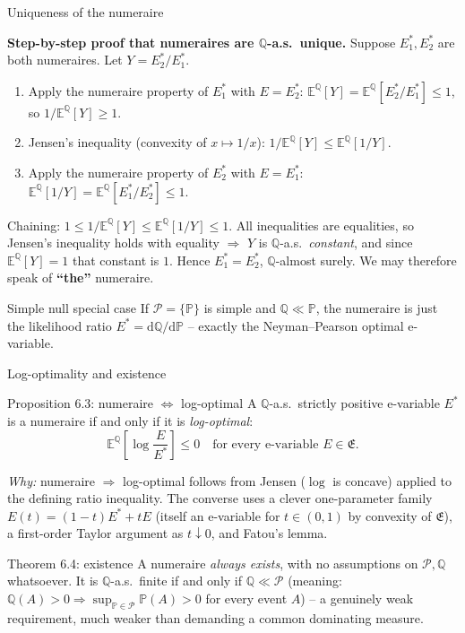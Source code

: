 \documentclass[aspectratio=169,10pt]{beamer}
\newcommand{\bE}{\mathbb{E}}
\newcommand{\bP}{\mathbb{P}}
\newcommand{\bQ}{\mathbb{Q}}
\newcommand{\cP}{\mathcal{P}}
\newcommand{\cE}{\mathfrak{E}}
\begin{document}
\begin{frame}{Uniqueness of the numeraire}

\textbf{Step-by-step proof that numeraires are $\bQ$-a.s.\ unique.}
Suppose $E_1^*, E_2^*$ are both numeraires. Let $Y = E_2^*/E_1^*$.

\begin{enumerate}
\item Apply the numeraire property of $E_1^*$ with $E = E_2^*$:
$\bE^{\bQ}[Y] = \bE^{\bQ}[E_2^*/E_1^*] \le 1$, so $1/\bE^{\bQ}[Y] \ge 1$.
\item Jensen's inequality (convexity of $x \mapsto 1/x$):
$1/\bE^{\bQ}[Y] \le \bE^{\bQ}[1/Y]$.
\item Apply the numeraire property of $E_2^*$ with $E = E_1^*$:
$\bE^{\bQ}[1/Y] = \bE^{\bQ}[E_1^*/E_2^*] \le 1$.
\end{enumerate}
Chaining: $1 \le 1/\bE^{\bQ}[Y] \le \bE^{\bQ}[1/Y] \le 1$. All
inequalities are equalities, so Jensen's inequality holds with equality
$\Rightarrow$ $Y$ is $\bQ$-a.s.\ \emph{constant}, and since
$\bE^{\bQ}[Y]=1$ that constant is $1$. Hence $E_1^* = E_2^*$,
$\bQ$-almost surely. We may therefore speak of \textbf{``the''}
numeraire.

\begin{block}{Simple null special case}
If $\cP = \{\bP\}$ is simple and $\bQ \ll \bP$, the numeraire is just
the likelihood ratio $E^* = \mathrm{d}\bQ/\mathrm{d}\bP$ -- exactly the
Neyman--Pearson optimal e-variable.
\end{block}
\end{frame}

\begin{frame}{Log-optimality and existence}

\begin{block}{Proposition 6.3: numeraire $\Leftrightarrow$ log-optimal}
A $\bQ$-a.s.\ strictly positive e-variable $E^*$ is a numeraire if and
only if it is \emph{log-optimal}:
\[
\bE^{\bQ}\!\left[\log \frac{E}{E^*}\right] \le 0 \quad \text{for every e-variable } E \in \cE.
\]
\end{block}

\emph{Why:} numeraire $\Rightarrow$ log-optimal follows from Jensen
($\log$ is concave) applied to the defining ratio inequality. The
converse uses a clever one-parameter family $E(t) = (1-t)E^* + tE$
(itself an e-variable for $t\in(0,1)$ by convexity of $\cE$), a
first-order Taylor argument as $t \downarrow 0$, and Fatou's lemma.

\begin{block}{Theorem 6.4: existence}
A numeraire \emph{always exists}, with no assumptions on $\cP,\bQ$
whatsoever. It is $\bQ$-a.s.\ finite if and only if
$\bQ \ll \cP$ (meaning: $\bQ(A)>0 \Rightarrow \sup_{\bP\in\cP}\bP(A)>0$
for every event $A$) -- a genuinely weak requirement, much weaker than
demanding a common dominating measure.
\end{block}
\end{frame}
\end{document}
